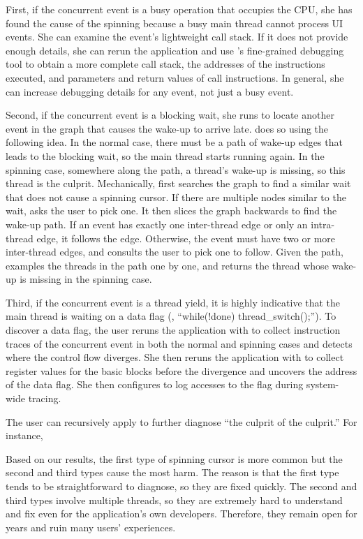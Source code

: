 First, if the concurrent event is a busy operation that occupies the CPU,
she has found the cause of the spinning because a busy main thread cannot
process UI events.  She can examine the event's lightweight call stack.
If it does not provide enough details, she can rerun the application and
use \xxx's fine-grained debugging tool to obtain a more complete call
stack, the addresses of the instructions executed, and parameters and
return values of call instructions.  In general, she can increase
debugging details for any event, not just a busy event.

Second, if the concurrent event is a blocking wait, she runs \xxx to
locate another event in the graph that causes the wake-up to arrive
late. \xxx does so using the following idea.  In the normal case, there
must be a path of wake-up edges that leads to the blocking wait, so the
main thread starts running again.  In the spinning case, somewhere along
the path, a thread's wake-up is missing, so this thread is the culprit.
Mechanically, \xxx first searches the graph to find a similar wait that
does not cause a spinning cursor.  If there are multiple nodes similar to
the wait, \xxx asks the user to pick one.  It then slices the graph
backwards to find the wake-up path.  If an event has exactly one
inter-thread edge or only an intra-thread edge, it follows the edge.
Otherwise, the event must have two or more inter-thread edges, and \xxx
consults the user to pick one to follow.  Given the path, \xxx examples
the threads in the path one by one, and returns the thread whose wake-up
is missing in the spinning case.

Third, if the concurrent event is a thread yield, it is highly indicative
that the main thread is waiting on a data flag (\eg, ``while(!done)
thread\_switch();'').  To discover a data flag, the user reruns the
application with \xxx to collect instruction traces of the concurrent
event in both the normal and spinning cases and detects where the control
flow diverges.  She then reruns the application with \xxx to collect
register values for the basic blocks before the divergence and uncovers
the address of the data flag.  She then configures \xxx to log accesses to
the flag during system-wide tracing.

The user can recursively apply \xxx to further diagnose ``the culprit of
the culprit.''  For instance, 

Based on our results, the first type of spinning cursor is more common but
the second and third types cause the most harm.  The reason is that the
first type tends to be straightforward to diagnose, so they are fixed
quickly.  The second and third types involve multiple threads, so they are
extremely hard to understand and fix even for the application's own
developers.  Therefore, they remain open for years and ruin many users'
experiences.

